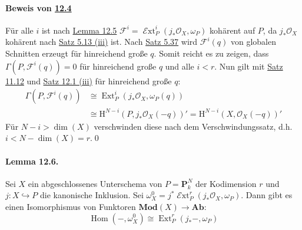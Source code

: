 \paragraph{Beweis von \hyperref[12.4]{12.4}} Für alle $i$ ist nach \hyperref[12.5]{Lemma 12.5} $\mathcal{F}^i=\operatorname{\mathcal{E}xt}^i_P(j_\ast\mathcal{O}_X,\omega_P)$ kohärent auf $P$, da $j_\ast\mathcal{O}_X$ kohärent nach \hyperref[5.13]{Satz 5.13 (iii)} ist. Nach \hyperref[5.37]{Satz 5.37} wird $\mathcal{F}^i(q)$ von globalen Schnitten erzeugt für hinreichend große $q$. Somit reicht es zu zeigen, dass $\Gamma(P,\mathcal{F}^i(q))=0$ für hinreichend große $q$ und alle $i<r$. Nun gilt mit \hyperref[11.12]{Satz 11.12} und \hyperref[12.1]{Satz 12.1 (iii)} für hinreichend große $q$:
\begin{align*}
\Gamma(P,\mathcal{F}^i(q)) &\cong \operatorname{Ext}_P^i(j_\ast\mathcal{O}_X,\omega_P(q))\\
&\cong \mathrm{H}^{N-i}(P,j_\ast\mathcal{O}_X(-q))' = \mathrm{H}^{N-i}(X,\mathcal{O}_X(-q))'
\end{align*}
Für $N-i>\dim(X)$ verschwinden diese nach dem Verschwindungssatz, d.h. $i<N-\dim(X)=r$.\qed

\paragraph{Lemma 12.6.}\label{12.6} Sei $X$ ein abgeschlossenes Unterschema von $P=\mathbf{P}_k^N$ der Kodimension $r$ und $j:X\hookrightarrow P$ die kanonische Inklusion. Sei $\omega_X^0=j^\ast\operatorname{\mathcal{E}xt}_P^r(j_\ast\mathcal{O}_X,\omega_P)$. Dann gibt es einen Isomorphismus von Funktoren $\mathbf{Mod}(X)\to\mathbf{Ab}$:
\[\operatorname{Hom}(-,\omega_X^0)\cong\operatorname{Ext}_P^r(j_\ast-,\omega_P) \]

\iffalse
\paragraph{Beweis.} Sei $0\to\omega_P\to\mathcal{J}^\bullet$ eine injektive Auflösung von $\omega_P$ in $\mathbf{Mod}(P)$ und $\mathcal{F}\in\mathbf{Mod}(X)$. Dann gilt:
\[\operatorname{Ext}_P^i(j_\ast\mathcal{F},\omega_P)=\mathrm{H}^i(\operatorname{Hom}_P(j_\ast\mathcal{F},\mathcal{J}^\bullet)) \]
Es faktorisiert jeder Morphismus $j_\ast\mathcal{F}\to\mathcal{J}^i$ über $\mathcal{I}^i = \operatorname{\mathcal{H}om}_P(j_\ast\mathcal{O}_X,\mathcal{J}^i)$. Also gilt:
\[\operatorname{Ext}_P^i(j_\ast\mathcal{F},\omega_P)=\mathrm{H}^i(\operatorname{Hom}_X(\mathcal{F},j^\ast\mathcal{I}^\bullet)) \]
Nun sind die $j^\ast\mathcal{I}^i$ alle injektive $\mathcal{O}_X$"~Moduln, da $\operatorname{Hom}_X(-,j^\ast\mathcal{I}^i)=\operatorname{Hom}_P(j_\ast-,\mathcal{J}^i)$ exakt ist. Wegen \hyperref[12.4]{Lemma 12.4} gilt für $i<r$:
\[\mathrm{H}^i(j^\ast\mathcal{I}^\bullet) = \mathrm{H}^i(j^\ast\operatorname{\mathcal{H}om}_P(j_\ast\mathcal{O}_X,\mathcal{J}^\bullet))=\operatorname{\mathcal{E}xt}^i_P(j_\ast\mathcal{O}_X,\omega_P)=0 \]
Also ist der Komplex $\mathcal{I}^\bullet$ exakt bis zum $r$-ten Schritt.
\fi

